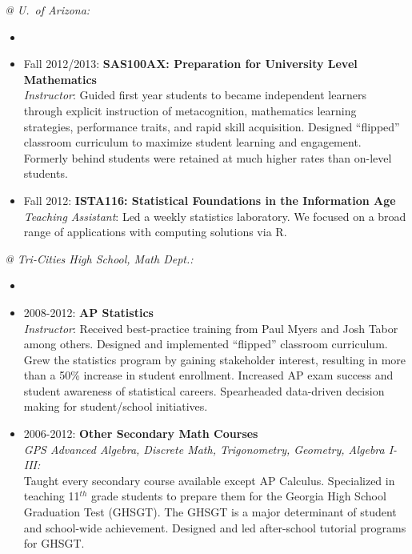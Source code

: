 \documentclass[paper=a4,fontsize=11pt]{scrartcl} %
\newcommand{\CourseEntry}[3]{
		\noindent \item{#1: \textbf{#2} \\ #3}}
\begin{document}
\noindent\textit{@ U.~of Arizona:}
\begin{itemize}[noitemsep]
\item[]
\vspace{-15pt}

\CourseEntry{Fall 2012/2013}{SAS100AX: Preparation for University Level Mathematics}{\textit{Instructor}: Guided first year students to became independent learners through explicit instruction of metacognition, mathematics learning strategies, performance traits, and rapid skill acquisition. Designed ``flipped'' classroom curriculum to maximize student learning and engagement. Formerly behind students were retained at much higher rates than on-level students.}
\CourseEntry{Fall 2012}{ISTA116: Statistical Foundations in the Information Age}{\textit{Teaching Assistant}: Led a weekly statistics laboratory. We focused on a broad range of applications with computing solutions via \textsc{R}.}

\end{itemize}

\noindent\textit{@ Tri-Cities High School, Math Dept.:}

\begin{itemize}
\item[]
\vspace{-24pt}

\CourseEntry{2008-2012}{AP Statistics}{\textit{Instructor}: Received best-practice training from Paul Myers and Josh Tabor among others. Designed and implemented ``flipped'' classroom curriculum. Grew the statistics program by gaining stakeholder interest, resulting in more than a 50\% increase in student enrollment. Increased AP exam success and student awareness of statistical careers. Spearheaded data-driven decision making for student/school initiatives.}
\CourseEntry{2006-2012}{Other Secondary Math Courses}{\textit{GPS Advanced Algebra, Discrete Math, Trigonometry, Geometry, Algebra I-III:} \\Taught every secondary course available except AP Calculus. Specialized in teaching 11$^{th}$ grade students to prepare them for the Georgia High School Graduation Test (GHSGT). The GHSGT is a major determinant of student and school-wide achievement. Designed and led after-school tutorial programs for GHSGT.}

\end{itemize}
\end{document}
